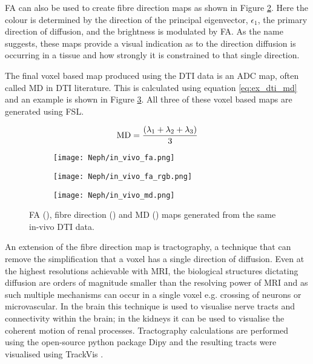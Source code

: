 \ac{FA} can also be used to create fibre direction maps as shown in Figure \ref{fig:ex_dti_fa_rgb}. Here the colour is determined by the direction of the principal eigenvector, $\epsilon_1$, the primary direction of diffusion, and the brightness is modulated by \ac{FA}. As the name suggests, these maps provide a visual indication as to the direction diffusion is occurring in a tissue and how strongly it is constrained to that single direction.

The final voxel based map produced using the \ac{DTI} data is an \ac{ADC} map, often called \ac{MD} in \ac{DTI} literature. This is calculated using equation \eqref{eq:ex_dti_md} and an example is shown in Figure \ref{fig:ex_dti_md}. All three of these voxel based maps are generated using \ac{FSL}.

\begin{equation}
	\textup{MD} = \frac{\left( \lambda_1 + \lambda_2 + \lambda_3 \right)}{3}
	\label{eq:ex_dti_md}
\end{equation}

\begin{figure}[H]
	\centering
	\begin{subfigure}[c]{0.31\textwidth}
		\centering
			\texttt{[image: Neph/in\_vivo\_fa.png]}
		\caption{}
		\label{fig:ex_dti_fa}
	\end{subfigure}
	\hfill
	\begin{subfigure}[c]{0.31\textwidth}
		\centering
			\texttt{[image: Neph/in\_vivo\_fa\_rgb.png]}
		\caption{}
		\label{fig:ex_dti_fa_rgb}
	\end{subfigure}
	\hfill	
	\begin{subfigure}[c]{0.31\textwidth}
		\centering
			\texttt{[image: Neph/in\_vivo\_md.png]}
		\caption{}
		\label{fig:ex_dti_md}
	\end{subfigure}
	\caption{\ac{FA} (), fibre direction () and \ac{MD} () maps generated from the same in-vivo \ac{DTI} data.}
	\label{fig:ex_dti_maps}
\end{figure}

An extension of the fibre direction map is tractography, a technique that can remove the simplification that a voxel has a single direction of diffusion. Even at the highest resolutions achievable with \ac{MRI}, the biological structures dictating diffusion are orders of magnitude smaller than the resolving power of \ac{MRI} and as such multiple mechanisms can occur in a single voxel e.g. crossing of neurons or microvascular. In the brain this technique is used to visualise nerve tracts and connectivity within the brain; in the kidneys it can be used to visualise the coherent motion of renal processes. Tractography calculations are performed using the open-source python package Dipy \cite{garyfallidis_dipy_2014} and the resulting tracts were visualised using TrackVis \cite{wang_diffusion_2007}.

